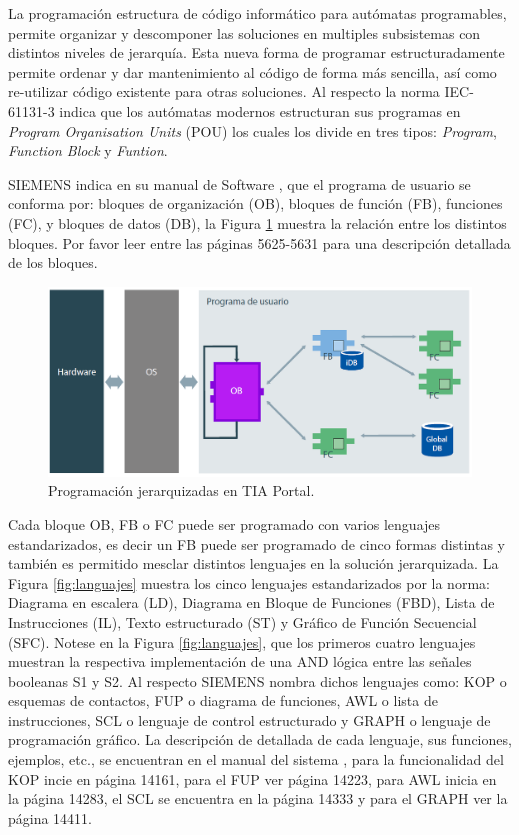 La programación  estructura de  código informático para autómatas programables, permite organizar y descomponer  las soluciones en multiples subsistemas con distintos niveles de jerarquía. Esta  nueva forma de programar estructuradamente permite ordenar y dar mantenimiento al código de forma más sencilla, así como re-utilizar  código existente para otras soluciones. Al respecto la norma IEC-61131-3 \cite{Tiegelkamp10} indica que los autómatas modernos estructuran sus programas en \textit{Program Organisation Units} (POU) los cuales los divide en tres tipos: \textit{Program}, \textit{Function Block} y \textit{Funtion}.  

SIEMENS indica en su manual de Software \cite{TIA-S7}, que el programa de usuario se conforma por: bloques  de organización (OB), bloques de función (FB), funciones (FC), y bloques de datos (DB), la Figura \ref{fig:plc} muestra la relación entre los distintos bloques. Por favor leer entre las páginas 5625-5631 para una descripción detallada de los bloques.

\begin{figure}[H]
	\centering
	\includegraphics[width=0.85\linewidth]{Imagenes/PLC}
	\caption{Programación jerarquizadas en TIA Portal. }
	\label{fig:plc}
\end{figure}


Cada bloque OB, FB o FC puede ser programado con varios lenguajes estandarizados, es decir un FB puede ser programado de cinco formas distintas y también es permitido mesclar distintos lenguajes en la solución jerarquizada. La Figura \ref{fig:languajes} muestra los cinco lenguajes estandarizados por la norma: Diagrama en escalera (LD), Diagrama en Bloque de Funciones (FBD), Lista de Instrucciones (IL), Texto estructurado (ST) y Gráfico de Función Secuencial (SFC). Notese en la Figura \ref{fig:languajes}, que los primeros cuatro lenguajes muestran la respectiva implementación de una AND lógica entre las señales booleanas  S1  y S2. Al respecto SIEMENS nombra dichos lenguajes como: KOP o esquemas de contactos, FUP o diagrama de funciones, AWL o lista de instrucciones, SCL o lenguaje de control estructurado y GRAPH o lenguaje de programación gráfico. La descripción de detallada de cada lenguaje, sus funciones, ejemplos, etc., se encuentran en el manual del sistema \cite{TIA-S7}, para la funcionalidad del KOP incie en página 14161, para el FUP ver página 14223, para  AWL inicia en la página 14283, el SCL se encuentra en la página 14333 y para el GRAPH ver la página 14411.


